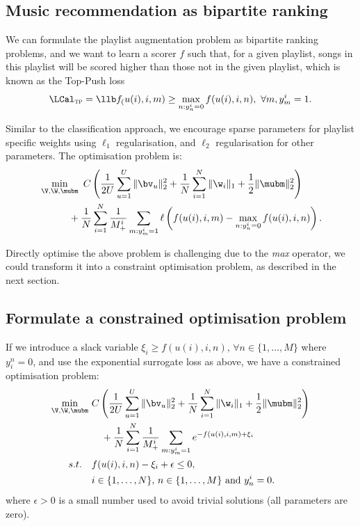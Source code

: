 \subsection{Music recommendation as bipartite ranking}

We can formulate the playlist augmentation problem as bipartite ranking problems, 
and we want to learn a scorer $f$ such that, for a given playlist, 
songs in this playlist will be scored higher than those not in the given playlist,
which is known as the Top-Push loss~\cite{li2014top}
\begin{equation*}
\LCal_\textsc{tp} = \llb f_(u(i), i, m) \ge \max_{n: y_n^i=0} f(u(i), i, n), \ \forall m, y_m^i = 1.
\end{equation*}

Similar to the classification approach, we encourage sparse parameters for playlist specific weights using $\ell_1$ regularisation,
and $\ell_2$ regularisation for other parameters. 
The optimisation problem is:
\begin{equation*}
\begin{aligned}
&\min_{\V, \W, \mubm} \ C \left( \frac{1}{2U} \sum_{u=1}^U \| \bv_u \|_2^2 
     + \frac{1}{N} \sum_{i=1}^N \| \w_i \|_1 + \frac{1}{2} \| \mubm \|_2^2 \right) \\
& \hspace{3em}
     + \frac{1}{N} \sum_{i=1}^N \frac{1}{M_+^i} \sum_{m: y_m^i = 1} \ell \left( f(u(i), i, m) - \max_{n: y_n^i = 0} f(u(i), i, n) \right).
\end{aligned}
\end{equation*}

Directly optimise the above problem is challenging due to the \emph{max} operator,
we could transform it into a constraint optimisation problem, as described in the next section.


\subsection{Formulate a constrained optimisation problem}
If we introduce a slack variable $\xi_i \ge f(u(i), i, n), \, \forall n \in \{1,\dots,M\}$ where $y_i^n = 0$,
and use the exponential surrogate loss as above, we have a constrained optimisation problem:
\begin{equation*}
\label{eq:primal_pla}
\begin{aligned}
\min_{\V, \W, \mubm} \ &
C \left( \frac{1}{2U} \sum_{u=1}^U \| \bv_u \|_2^2  
     + \frac{1}{N} \sum_{i=1}^N \| \w_i \|_1 + \frac{1}{2} \| \mubm \|_2^2 \right) \\
& \hspace{1em}
     + \frac{1}{N} \sum_{i=1}^N \frac{1}{M_+^i} \sum_{m: y_m^i = 1} e^{-f(u(i), i, m) + \xi_i} \\
s.t. \quad & 
f(u(i), i, n) - \xi_i + \epsilon \le 0, \\
& i \in \{1,\dots,N\}, \, n \in \{1,\dots,M\} \ \mathrm{and} \ y_n^i = 0.
\end{aligned}
\end{equation*}
where $\epsilon > 0$ is a small number used to avoid trivial solutions (\ie all parameters are zero).

